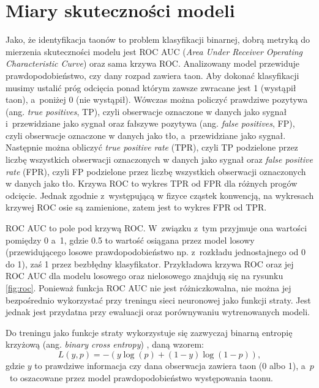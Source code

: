 \documentclass{pracalicmgr}
\begin{document}
	\section{Miary skuteczności modeli}
	Jako, że identyfikacja taonów to problem klasyfikacji binarnej, dobrą metryką do mierzenia skuteczności modelu jest ROC AUC (\textit{Area Under Receiver Operating Characteristic Curve}) oraz sama krzywa ROC. Analizowany model przewiduje prawdopodobieństwo, czy dany rozpad zawiera taon. Aby dokonać klasyfikacji musimy ustalić próg odcięcia ponad którym zawsze zwracane jest 1 (wystąpił taon), a~poniżej 0 (nie wystąpił). Wówczas można policzyć prawdziwe pozytywa (ang. \textit{true positives}, TP), czyli obserwacje oznaczone w danych jako sygnał i~przewidziane jako sygnał oraz fałszywe pozytywa (ang. \textit{false positives}, FP), czyli obserwacje oznaczone w danych jako tło, a~przewidziane jako sygnał. Następnie można obliczyć \textit{true positive rate} (TPR), czyli TP podzielone przez liczbę wszystkich obserwacji oznaczonych w danych jako sygnał oraz \textit{false positive rate} (FPR), czyli FP podzielone przez liczbę wszystkich obserwacji oznaczonych w danych jako tło. Krzywa ROC to wykres TPR od FPR dla różnych progów odcięcie. Jednak zgodnie z~występującą w fizyce cząstek konwencją, na wykresach krzywej ROC osie są zamienione, zatem jest to wykres FPR od TPR. 
	
	ROC AUC to pole pod krzywą ROC. W~związku z~tym przyjmuje ona wartości pomiędzy 0 a~1, gdzie 0.5 to wartość osiągana przez model losowy (przewidującego losowe prawdopodobieństwo np. z~rozkładu jednostajnego od 0 do 1), zaś 1 przez bezbłędny klasyfikator. Przykładowa krzywa ROC oraz jej ROC AUC dla modelu losowego oraz nielosowego znajdują się na rysunku \ref{fig:roc}. Ponieważ funkcja ROC AUC nie jest różniczkowalna, nie można jej bezpośrednio wykorzystać przy treningu sieci neuronowej jako funkcji straty. Jest jednak jest przydatna przy ewaluacji oraz porównywaniu wytrenowanych modeli.
	
	Do treningu jako funkcje straty wykorzystuje się zazwyczaj binarną entropię krzyżową (ang. \textit{binary cross entropy}) \cite{dl}, daną wzorem: $$ L(y, p) = -(y\log(p)+(1-y)\log(1-p)),$$ gdzie $y$ to prawdziwe informacja czy dana obserwacja zawiera taon (0 albo 1), a~$p$~to oszacowane przez model prawdopodobieństwo występowania taonu.
\end{document}

